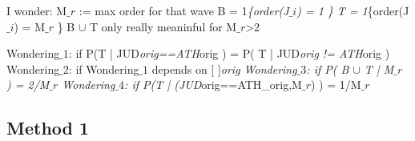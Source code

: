 \documentclass[12pt,a4paper]{article}
\begin{document}
I wonder: M\ensuremath{\_r} := max order for that wave B = 1\emph{\{order(J\ensuremath{\_i}) = 1 \} T = 1}\{order(J\ensuremath{\_i}) = M\ensuremath{\_r} \} B \ensuremath{\cup} T only really meaninful for M\ensuremath{\_r}>2

Wondering\ensuremath{\_1}: if P(T | JUD\emph{orig==ATH}orig ) =  P( T | JUD\emph{orig != ATH}orig ) Wondering\ensuremath{\_2}: if Wondering\ensuremath{\_1} depends on [   ]\emph{orig Wondering\ensuremath{\_3}: if P( B \ensuremath{\cup} T | M\ensuremath{\_r} ) = 2/M\ensuremath{\_r} Wondering\ensuremath{\_4}: if P(T | (JUD}orig==ATH\_orig,M\ensuremath{\_r}) ) = 1/M\ensuremath{\_r}


\subsection{Method 1}
\end{document}
